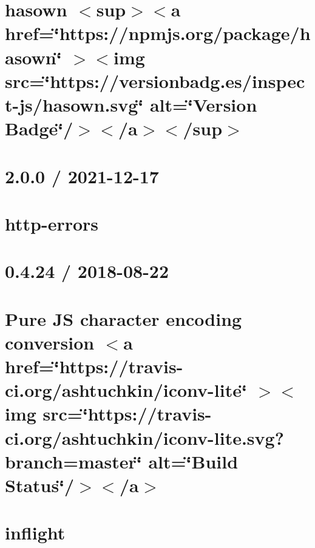 \documentclass[twoside]{book}
\newcommand{\+}{\discretionary{\mbox{\scriptsize$\hookleftarrow$}}{}{}}
\begin{document}
\chapter{hasown \texorpdfstring{$<$}{<}sup\texorpdfstring{$>$}{>}\texorpdfstring{$<$}{<}a href=\char`\"{}https\+://npmjs.\+org/package/hasown\char`\"{} \texorpdfstring{$>$}{>}\texorpdfstring{$<$}{<}img src=\char`\"{}https\+://versionbadg.\+es/inspect-\/js/hasown.\+svg\char`\"{} alt=\char`\"{}\+Version Badge\char`\"{}/\texorpdfstring{$>$}{>}\texorpdfstring{$<$}{<}/a\texorpdfstring{$>$}{>}\texorpdfstring{$<$}{<}/sup\texorpdfstring{$>$}{>}}
\label{md_src_nodejs_node_modules_hasown_README}

\chapter{2.0.0 / 2021-\/12-\/17}
\label{md_src_nodejs_node_modules_http_errors_HISTORY}

\chapter{http-\/errors}
\label{md_src_nodejs_node_modules_http_errors_README}

\chapter{0.4.24 / 2018-\/08-\/22}
\label{md_src_nodejs_node_modules_iconv_lite_Changelog}

\chapter{Pure JS character encoding conversion \texorpdfstring{$<$}{<}a href=\char`\"{}https\+://travis-\/ci.\+org/ashtuchkin/iconv-\/lite\char`\"{} \texorpdfstring{$>$}{>}\texorpdfstring{$<$}{<}img src=\char`\"{}https\+://travis-\/ci.\+org/ashtuchkin/iconv-\/lite.\+svg?branch=master\char`\"{} alt=\char`\"{}\+Build Status\char`\"{}/\texorpdfstring{$>$}{>}\texorpdfstring{$<$}{<}/a\texorpdfstring{$>$}{>}}
\label{md_src_nodejs_node_modules_iconv_lite_README}

\chapter{inflight}
\label{md_src_nodejs_node_modules_inflight_README}

\end{document}
